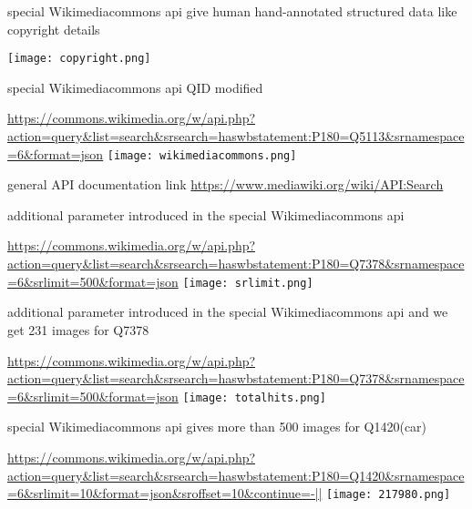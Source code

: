 \documentclass{beamer}
\begin{document}
\begin{frame}{special Wikimediacommons api give human hand-annotated structured data like copyright details}


  \texttt{[image: copyright.png]}     


\end{frame}

\begin{frame}{special Wikimediacommons api QID modified}


\url{https://commons.wikimedia.org/w/api.php?action=query&list=search&srsearch=haswbstatement:P180=Q5113&srnamespace=6&format=json}
  \texttt{[image: wikimediacommons.png]}     


    

\end{frame}
\begin{frame}{general API documentation link}
\url{https://www.mediawiki.org/wiki/API:Search}
\end{frame}
\begin{frame}{additional parameter introduced in the special Wikimediacommons api }

\url{https://commons.wikimedia.org/w/api.php?action=query&list=search&srsearch=haswbstatement:P180=Q7378&srnamespace=6&srlimit=500&format=json}
  \texttt{[image: srlimit.png]}     


\end{frame}

\begin{frame}{additional parameter introduced in the special Wikimediacommons api and we get 231 images for Q7378 }

\url{https://commons.wikimedia.org/w/api.php?action=query&list=search&srsearch=haswbstatement:P180=Q7378&srnamespace=6&srlimit=500&format=json}
  \texttt{[image: totalhits.png]}     


\end{frame}

\begin{frame}{special Wikimediacommons api gives more than 500 images for Q1420(car) }

\url{https://commons.wikimedia.org/w/api.php?action=query&list=search&srsearch=haswbstatement:P180=Q1420&srnamespace=6&srlimit=10&format=json&sroffset=10&continue=-||}
  \texttt{[image: 217980.png]}     


\end{frame}
\end{document}

